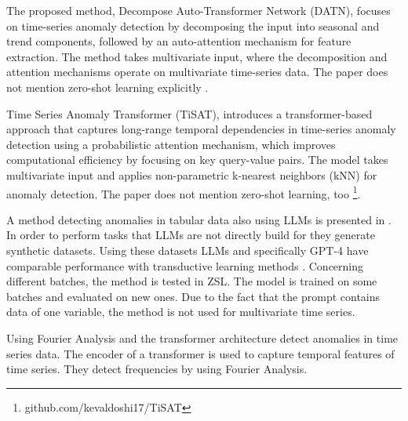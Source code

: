 The proposed method, Decompose Auto-Transformer Network (DATN), focuses on time-series anomaly detection by decomposing the input into seasonal and trend components, followed by an auto-attention mechanism for feature extraction. The method takes multivariate input, where the decomposition and attention mechanisms operate on multivariate time-series data. The paper does not mention zero-shot learning explicitly \cite{wu_decompose_2023}.

Time Series Anomaly Transformer (TiSAT), introduces a transformer-based approach that captures long-range temporal dependencies in time-series anomaly detection using a probabilistic attention mechanism, which improves computational efficiency by focusing on key query-value pairs. The model takes multivariate input and applies non-parametric k-nearest neighbors (kNN) for anomaly detection. The paper does not mention zero-shot learning, too \cite{doshi_tisat_2022} \footnote{\fussy\tiny github.com/kevaldoshi17/TiSAT}.

\cite{peng_tcf-trans_2023}

\cite{li_dct-gan_2023}

\cite{shin_time_2023}



A method detecting anomalies in tabular data also using LLMs is presented in \cite{li_anomaly_2024}. In order to perform tasks that LLMs are not directly build for they generate synthetic datasets. Using these datasets LLMs and specifically GPT-4 have comparable performance with transductive learning methods \cite[p. 6]{li_anomaly_2024}. Concerning different batches, the method is tested in ZSL. The model is trained on some batches and evaluated on new ones. Due to the fact that the prompt contains data of one variable, the method is not used for multivariate time series.

Using Fourier Analysis and the transformer architecture \cite{ye_multivariate_2023} detect anomalies in time series data. The encoder of a transformer is used to capture temporal features of time series. They detect frequencies by using Fourier Analysis.

